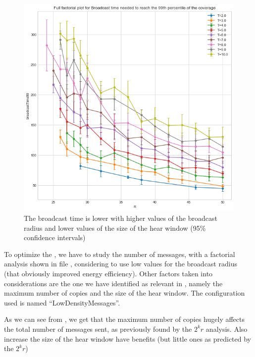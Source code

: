 \begin{figure}
	\centering
	\includegraphics[width=\textwidth]{img/ld/broadcasttime-R-ffplot}
	\caption{The broadcast time is lower with higher values of the broadcast
	radius and lower values of the size of the hear
	window (95\% confidence intervals)}\label{fig:recttimeff}
\end{figure}

To optimize the , we have to study the number of
messages, with a factorial analysis shown in file ,
considering to use low values for the broadcast radius (that obviously improved
energy efficiency). Other factors taken into considerations are the one we have
identified as relevant in , namely the maximum number of
copies and the size of the hear window. The configuration used is named
``LowDensityMessages''.

As we can see from , we get that the maximum number of
copies hugely affects the total number of messages sent, as previously found by
the \(2^{k}r\) analysis. Also increase the size of the hear window have benefits
(but little ones as predicted by the \(2^{k}r\))

